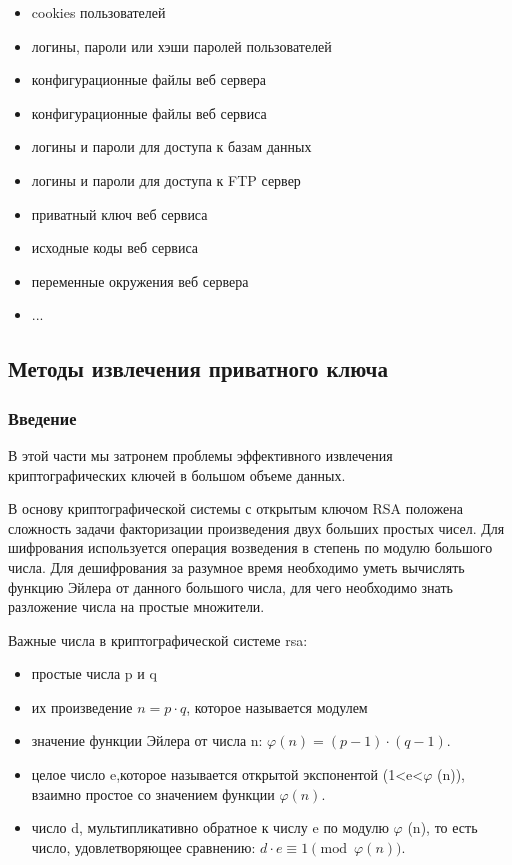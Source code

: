 \documentclass[20pt]{article}
\begin{document}
\begin{itemize}
  \item cookies пользователей
  \item логины, пароли или хэши паролей пользователей
  \item конфигурационные файлы веб сервера
  \item конфигурационные файлы веб сервиса
  \item логины и пароли для доступа к базам данных
  \item логины и пароли для доступа к FTP сервер
  \item приватный ключ веб сервиса
  \item исходные коды веб сервиса
  \item переменные окружения веб сервера
  \item ...
\end{itemize}

\subsection{Методы извлечения приватного ключа \cite{playing-hide-and-seek-with-stored-keys} }
\subsubsection{Введение}
В этой части мы затронем проблемы эффективного извлечения криптографических
ключей в большом объеме данных.

В основу криптографической системы с открытым ключом RSA положена сложность задачи
факторизации произведения двух больших простых чисел. Для шифрования используется
операция возведения в степень по модулю большого числа. Для дешифрования за
разумное время необходимо уметь вычислять функцию Эйлера от данного большого
числа, для чего необходимо знать разложение числа на простые множители.

Важные числа в криптографической системе rsa:
\begin{itemize}
  \item простые числа p и q
  \item их произведение $n=p \cdot q$, которое называется модулем
  \item значение функции Эйлера от числа n: $\varphi (n)=(p-1)\cdot (q-1)$.
  \item целое число e,которое называется открытой экспонентой
    (1<e<$\varphi$ (n)), взаимно простое со значением функции $\varphi(n)$.
  \item число d, мультипликативно обратное к числу e по модулю
    $\varphi$ (n), то есть число, удовлетворяющее сравнению: $d\cdot e\equiv 1{\pmod {\varphi (n)}}$.
\end{itemize}
\end{document}
